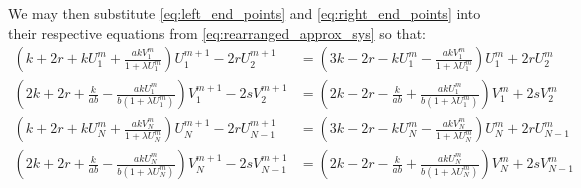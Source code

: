 We may then substitute \eqref{eq:left_end_points} and
\eqref{eq:right_end_points} into their respective equations from
\eqref{eq:rearranged_approx_sys} so that:
\begin{subequations} \label{eq:rearranged_approx_sys_endpoints}
\begin{align}
    \left(
        k + 2r + k U_1^m + \frac{a k V_1^m}{1 + \lambda U_1^m}
    \right)
    U_{1}^{m+1} - 2r U_{2}^{m+1} &=
    \left(
        3k - 2r - k U_1^m - \frac{a k V_1^m}{1 + \lambda U_1^m}
    \right)
    U_{1}^{m} + 2r U_{2}^{m}
    \\
    \left(
        2k + 2r + \frac{k}{ab} - \frac{a k U_1^m}{b ( 1 + \lambda U_1^m )}
    \right)
    V_{1}^{m+1} - 2s V_{2}^{m+1} &=
    \left(
        2k - 2r - \frac{k}{ab} + \frac{a k U_1^m}{b ( 1 + \lambda U_1^m )}
    \right)
    V_{1}^{m} + 2s V_{2}^{m}
    \\
    \left(
        k + 2r + k U_N^m + \frac{a k V_N^m}{1 + \lambda U_N^m}
    \right)
    U_{N}^{m+1} - 2r U_{N-1}^{m+1} &=
    \left(
        3k - 2r - k U_N^m - \frac{a k V_N^m}{1 + \lambda U_N^m}
    \right)
    U_{N}^{m} + 2r U_{N-1}^{m}
    \\
    \left(
        2k + 2r + \frac{k}{ab} - \frac{a k U_N^m}{b ( 1 + \lambda U_N^m )}
    \right)
    V_{N}^{m+1} - 2s V_{N-1}^{m+1} &=
    \left(
        2k - 2r - \frac{k}{ab} + \frac{a k U_N^m}{b ( 1 + \lambda U_N^m )}
    \right)
    V_{N}^{m} + 2s V_{N-1}^{m}
\end{align}
\end{subequations}

